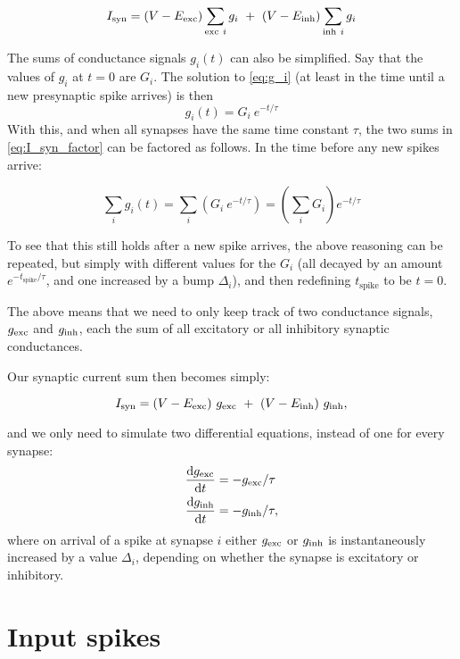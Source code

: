 \begin{equation}
    I_{\text{syn}} = (V - E_{\text{exc}}) \sum_{\text{exc}\ i} g_i \  + \  (V - E_{\text{inh}}) \sum_{\text{inh}\ i} g_i
    \label{eq:I_syn_factor}
\end{equation}

The sums of conductance signals $g_i(t)$ can also be simplified. Say that the values of $g_i$ at $t = 0$ are $G_i$. The solution to \cref{eq:g_i} (at least in the time until a new presynaptic spike arrives) is then
\begin{equation}
    g_i(t) = G_i\ e^{-t/\tau}
\end{equation}
With this, and when all synapses have the same time constant $\tau$, the two sums in \cref{eq:I_syn_factor} can be factored as follows. In the time before any new spikes arrive:

\begin{equation}
    \sum_i g_i(t) = \sum_i \left( G_i\ e^{-t/\tau} \right)
                            = \left( \sum_i G_i  \right) e^{-t/\tau}
\end{equation}

To see that this still holds after a new spike arrives, the above reasoning can be repeated, but simply with different values for the $G_i$ (all decayed by an amount $e^{-t_\text{spike}/\tau}$, and one increased by a bump $\Delta_i$), and then redefining $t_\text{spike}$ to be $t = 0$.

The above means that we need to only keep track of two conductance signals, $g_{\text{exc}}$ and $g_{\text{inh}}$, each the sum of all excitatory or all inhibitory synaptic conductances.

Our synaptic current sum then becomes simply:

\begin{equation}
    I_{\text{syn}} = (V - E_{\text{exc}})\ g_{\text{exc}} \  + \  (V - E_{\text{inh}})\ g_{\text{inh}},
\end{equation}

and we only need to simulate two differential equations, instead of one for every synapse:
\begin{align*}
    \frac{\mathrm{d}g_{\text{exc}}}{\mathrm{d}t} &= -g_{\text{exc}} / \tau \\
    \frac{\mathrm{d}g_{\text{inh}}}{\mathrm{d}t} &= -g_{\text{inh}} / \tau,
\end{align*}
where on arrival of a spike at synapse $i$ either $g_{\text{exc}}$ or $g_{\text{inh}}$ is instantaneously increased by a value $\Delta_i$, depending on whether the synapse is excitatory or inhibitory.


\section{Input spikes}

